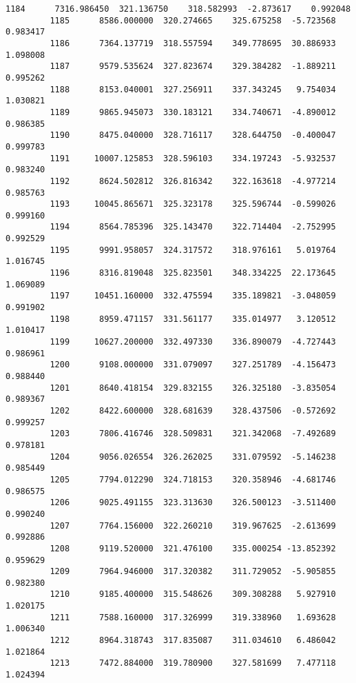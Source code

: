 \documentclass[11pt]{article}
\begin{document}
\begin{Verbatim}[commandchars=\\\{\}]
         1184      7316.986450  321.136750    318.582993  -2.873617    0.992048   
         1185      8586.000000  320.274665    325.675258  -5.723568    0.983417   
         1186      7364.137719  318.557594    349.778695  30.886933    1.098008   
         1187      9579.535624  327.823674    329.384282  -1.889211    0.995262   
         1188      8153.040001  327.256911    337.343245   9.754034    1.030821   
         1189      9865.945073  330.183121    334.740671  -4.890012    0.986385   
         1190      8475.040000  328.716117    328.644750  -0.400047    0.999783   
         1191     10007.125853  328.596103    334.197243  -5.932537    0.983240   
         1192      8624.502812  326.816342    322.163618  -4.977214    0.985763   
         1193     10045.865671  325.323178    325.596744  -0.599026    0.999160   
         1194      8564.785396  325.143470    322.714404  -2.752995    0.992529   
         1195      9991.958057  324.317572    318.976161   5.019764    1.016745   
         1196      8316.819048  325.823501    348.334225  22.173645    1.069089   
         1197     10451.160000  332.475594    335.189821  -3.048059    0.991902   
         1198      8959.471157  331.561177    335.014977   3.120512    1.010417   
         1199     10627.200000  332.497330    336.890079  -4.727443    0.986961   
         1200      9108.000000  331.079097    327.251789  -4.156473    0.988440   
         1201      8640.418154  329.832155    326.325180  -3.835054    0.989367   
         1202      8422.600000  328.681639    328.437506  -0.572692    0.999257   
         1203      7806.416746  328.509831    321.342068  -7.492689    0.978181   
         1204      9056.026554  326.262025    331.079592  -5.146238    0.985449   
         1205      7794.012290  324.718153    320.358946  -4.681746    0.986575   
         1206      9025.491155  323.313630    326.500123  -3.511400    0.990240   
         1207      7764.156000  322.260210    319.967625  -2.613699    0.992886   
         1208      9119.520000  321.476100    335.000254 -13.852392    0.959629   
         1209      7964.946000  317.320382    311.729052  -5.905855    0.982380   
         1210      9185.400000  315.548626    309.308288   5.927910    1.020175   
         1211      7588.160000  317.326999    319.338960   1.693628    1.006340   
         1212      8964.318743  317.835087    311.034610   6.486042    1.021864   
         1213      7472.884000  319.780900    327.581699   7.477118    1.024394   
         

\end{Verbatim}
\end{document}
